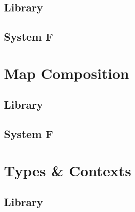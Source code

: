 \documentclass[sigplan,10pt]{acmart}
\newenvironment{LibCode*}{%
  \begin{tcolorbox}[%
    colframe=white,%
    boxrule=0.0pt,%
    top=2.5pt,%
    left=2.5pt,%
    bottom=2.5pt,%
    right=2.5pt,%
    boxsep=0pt%
  ]\vspace{-0.2\baselineskip}%
}{%
  \vspace{-1\baselineskip}%
  \end{tcolorbox}%
}
\newcommand*\LibCode[1]{\begin{LibCode*}{#1}\end{LibCode*}}
\newcommand*\AppCode[1]{{#1}}
\begin{document}
  \subsection{Library}
  \LibCode\KAp
  \LibCode\KExt
  \LibCode\KLift
  \LibCode\KId
  \LibCode\KSingle
  \LibCode\KWeaken
  \LibCode\KEq
  \LibCode\KFunExt
  \LibCode\KIdLift
  \LibCode\KKitNotation
  \LibCode\KTraversal
  \LibCode\KKitInstances
  \LibCode\KKitOpen
  \subsection{System F}
  \AppCode\FTraversalOp
  \AppCode\FTraversalId
  \AppCode\FTraversalIdProofInteresting
  \AppCode\FTraversal

  \section{Map Composition}
  \subsection{Library}
  \LibCode\KWkKit
  \LibCode\KWkKitInstances
  \LibCode\KComposeKit
  \LibCode\KComposition
  \LibCode\KComposeKitAp
  \LibCode\KDistLiftCompose
  \LibCode\KComposeKitNotation
  \LibCode\KComposeTraversal
  \LibCode\KCommLiftWeaken
  \LibCode\KCommLiftWeakenTraverse
  \LibCode\KComposeKitInstances
  \LibCode\KComposeKitInstancesConcrete
  \LibCode\KWeakenCancelsSingle
  \LibCode\KWeakenCancelsSingleTraverse
  \LibCode\KDistLiftSingle
  \LibCode\KDistLiftSingleTraverse
  \subsection{System F}
  \AppCode\FAssoc
  \AppCode\FAssocProofInteresting
  \AppCode\FComposeTraversal

  \section{Types \& Contexts}
  \subsection{Library}
  \LibCode\KTypeSorts
  \LibCode\KTypes
  \LibCode\KContextHelper
  \LibCode\KContexts
  \LibCode\KContextLookup
\end{document}
